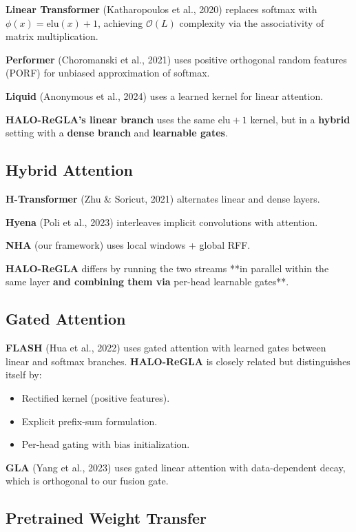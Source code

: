 \textbf{Linear Transformer} (Katharopoulos et al., 2020) replaces softmax with 
$\phi(x) = \mathrm{elu}(x) + 1$, achieving $\mathcal{O}(L)$ complexity via 
the associativity of matrix multiplication.

\textbf{Performer} (Choromanski et al., 2021) uses positive orthogonal random 
features (PORF) for unbiased approximation of softmax.

\textbf{Liquid} (Anonymous et al., 2024) uses a learned kernel for linear attention.

\textbf{HALO-ReGLA's linear branch} uses the same $\mathrm{elu} + 1$ kernel, but 
in a \textbf{hybrid} setting with a \textbf{dense branch} and \textbf{learnable gates}.

\subsection{Hybrid Attention}

\textbf{H-Transformer} (Zhu \& Soricut, 2021) alternates linear and dense layers.

\textbf{Hyena} (Poli et al., 2023) interleaves implicit convolutions with attention.

\textbf{NHA} (our framework) uses local windows + global RFF.

\textbf{HALO-ReGLA} differs by running the two streams **in parallel within the 
same layer\textbf{ and combining them via }per-head learnable gates**.

\subsection{Gated Attention}

\textbf{FLASH} (Hua et al., 2022) uses gated attention with learned gates between 
linear and softmax branches. \textbf{HALO-ReGLA} is closely related but 
distinguishes itself by:
\begin{itemize}
\item Rectified kernel (positive features).
\item Explicit prefix-sum formulation.
\item Per-head gating with bias initialization.

\end{itemize}
\textbf{GLA} (Yang et al., 2023) uses gated linear attention with data-dependent 
decay, which is orthogonal to our fusion gate.

\subsection{Pretrained Weight Transfer}

